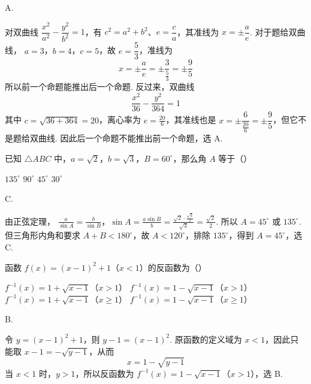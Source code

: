 \begin{answer}
A.
\end{answer}

\begin{solution}
对双曲线 \(\dfrac{x^2}{a^2}-\dfrac{y^2}{b^2}=1\)，有
\(c^2=a^2+b^2\)、\(e=\dfrac ca\)，其准线为 \(x=\pm\dfrac ae\). 对于题给双曲线，
\(a=3\)，\(b=4\)，\(c=5\)，故 \(e=\dfrac53\)，准线为
\[
x=\pm\frac{a}{e}=\pm\frac{3}{\frac{5}{3}}=\pm\frac95
\]
所以前一个命题能推出后一个命题. 反过来，双曲线
\[
\frac{x^2}{36}-\frac{y^2}{364}=1
\]
其中 \(c=\sqrt{36+364}=20\)，离心率为 \(e=\frac{20}{6}\)，其准线也是
\(x=\pm\dfrac{6}{\frac{20}{6}}=\pm\dfrac95\)，但它不是题给双曲线. 因此后一个命题不能推出前一个命题，选 A.
\end{solution}

\begin{problem}
已知 \(\triangle ABC\) 中，\(a = \sqrt{2}\)，\(b = \sqrt{3}\)，\(B = 60^{\circ}\)，那么角 \(A\) 等于（\quad）

\choices
    {\(135^{\circ}\)}
    {\(90^{\circ}\)}
    {\(45^{\circ}\)}
    {\(30^{\circ}\)}
\end{problem}

\begin{answer}
C.
\end{answer}

\begin{solution}
由正弦定理，
\(\frac{a}{\sin A}=\frac{b}{\sin B}\)，\(\sin A=\frac{a\sin B}{b}=\frac{\sqrt2\cdot\frac{\sqrt3}{2}}{\sqrt3}=\frac{\sqrt2}{2}\).
所以 \(A=45^{\circ}\) 或 \(135^{\circ}\). 但三角形内角和要求
\(A+B<180^{\circ}\)，故 \(A<120^{\circ}\)，排除 \(135^{\circ}\)，得到
\(A=45^{\circ}\)，选 C.
\end{solution}

\begin{problem}
函数 \( f(x) = (x - 1)^2 + 1 \)（\(x < 1\)）的反函数为（\quad）

\choices
    {\(f^{-1}(x) = 1 + \sqrt{x - 1}\)（\(x > 1\)）}
    {\(f^{-1}(x) = 1 - \sqrt{x - 1}\)（\(x > 1\)）}
    {\(f^{-1}(x) = 1 + \sqrt{x - 1}\)（\(x \geqslant 1\)）}
    {\(f^{-1}(x) = 1 - \sqrt{x - 1}\)（\(x \geqslant 1\)）}
\end{problem}

\begin{answer}
B.
\end{answer}

\begin{solution}
令 \(y=(x-1)^2+1\)，则 \(y-1=(x-1)^2\). 原函数的定义域为 \(x<1\)，因此只能取
\(x-1=-\sqrt{y-1}\)，从而
\[
x=1-\sqrt{y-1}
\]
当 \(x<1\) 时，\(y>1\)，所以反函数为
\(f^{-1}(x)=1-\sqrt{x-1}\)（\(x>1\)），选 B.
\end{solution}


